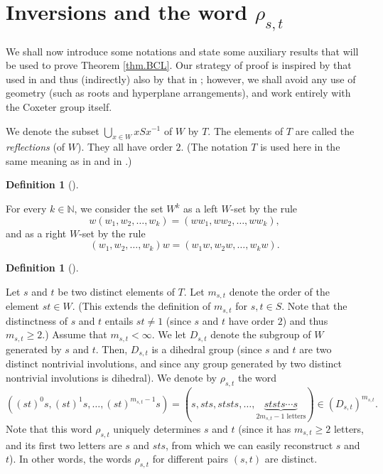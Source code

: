 \documentclass[numbers=enddot,12pt,final,onecolumn,notitlepage,abstracton]{scrartcl}%
\theoremstyle{definition}
\newtheorem{defi}[theo]{Definition}
\newenvironment{definition}[1][]
{\begin{defi}[#1]\begin{leftbar}}
{\end{leftbar}\end{defi}}
\begin{document}
\section{Inversions and the word $\rho_{s,t}$}

We shall now introduce some notations and state some auxiliary results that
will be used to prove Theorem \ref{thm.BCL}. Our strategy of proof is inspired
by that used in \cite[\S 3.4]{BCL} and thus (indirectly) also by that in
\cite[\S 3, and proof of Corollary 5.2]{ReiRoi11}; however, we shall avoid any
use of geometry (such as roots and hyperplane arrangements), and work entirely
with the Coxeter group itself.

We denote the subset $\bigcup\limits_{x\in W}xSx^{-1}$ of $W$ by $T$. The
elements of $T$ are called the \emph{reflections} (of $W$). They all have
order $2$. (The notation $T$ is used here in the same meaning as in
\cite[\S 1]{Lusztig-Hecke} and in \cite[Chapter 4, n$^{\circ}$ 1.4]%
{Bourbaki4-6}.)

\begin{definition}
\label{def.biset}For every $k\in\mathbb{N}$, we consider the set $W^{k}$ as a
left $W$-set by the rule%
\[
w\left(  w_{1},w_{2},\ldots,w_{k}\right)  =\left(  ww_{1},ww_{2},\ldots
,ww_{k}\right)  ,
\]
and as a right $W$-set by the rule%
\[
\left(  w_{1},w_{2},\ldots,w_{k}\right)  w=\left(  w_{1}w,w_{2}w,\ldots
,w_{k}w\right)  .
\]

\end{definition}

\begin{definition}
Let $s$ and $t$ be two distinct elements of $T$. Let $m_{s,t}$ denote the
order of the element $st\in W$. (This extends the definition of $m_{s,t}$ for
$s,t\in S$. Note that the distinctness of $s$ and $t$ entails $st\neq1$ (since
$s$ and $t$ have order $2$) and thus $m_{s,t}\geq2$.) Assume that
$m_{s,t}<\infty$. We let $D_{s,t}$ denote the subgroup of $W$ generated by $s$
and $t$. Then, $D_{s,t}$ is a dihedral group (since $s$ and $t$ are two
distinct nontrivial involutions, and since any group generated by two distinct
nontrivial involutions is dihedral). We denote by $\rho_{s,t}$ the word%
\[
\left(  \left(  st\right)  ^{0}s,\left(  st\right)  ^{1}s,\ldots,\left(
st\right)  ^{m_{s,t}-1}s\right)  =\left(  s,sts,ststs,\ldots
,\underbrace{ststs\cdots s}_{2m_{s,t}-1\text{ letters}}\right)  \in\left(
D_{s,t}\right)  ^{m_{s,t}}.
\]
Note that this word $\rho_{s,t}$ uniquely determines $s$ and $t$ (since it has
$m_{s,t}\geq2$ letters, and its first two letters are $s$ and $sts$, from
which we can easily reconstruct $s$ and $t$). In other words, the words
$\rho_{s,t}$ for different pairs $\left(  s,t\right)  $ are distinct.
\end{definition}
\end{document}
